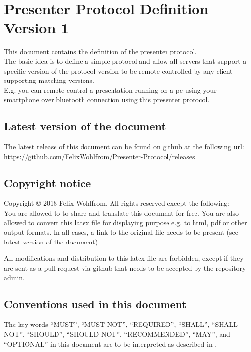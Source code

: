 \documentclass[]{article}
\begin{document}
\section*{Presenter Protocol Definition Version 1}

This document contains the definition of the presenter protocol.\\
The basic idea is to define a simple protocol and allow all servers that support a specific version of the protocol version to be remote controlled by any client supporting matching versions.\\
E.g. you can remote control a presentation running on a pc using your smartphone over bluetooth connection using this presenter protocol.

\tableofcontents

\subsection{Latest version of the document}
\label{latest_version}

The latest release of this document can be found on github at the following url: \url{https://github.com/FelixWohlfrom/Presenter-Protocol/releases}

\subsection{Copyright notice}

Copyright © 2018 Felix Wohlfrom. All rights reserved except the following:\\
You are allowed to to share and translate this document for free. You are also allowed to convert this latex file for displaying purpose e.g. to html, pdf or other output formats. In all cases, a link to the original file needs to be present (see \hyperref[latest_version]{latest version of the document}).

All modifications and distribution to this latex file are forbidden, except if they are sent as a \href{https://github.com/FelixWohlfrom/Presenter-Protocol/pulls}{pull request} via github that needs to be accepted by the repository admin.

\subsection{Conventions used in this document}

The key words ``MUST'', ``MUST NOT'', ``REQUIRED'', ``SHALL'', ``SHALL NOT'', ``SHOULD'', ``SHOULD NOT'', ``RECOMMENDED'', ``MAY'', and ``OPTIONAL'' in this document are to be interpreted as described in \cite{RFC2119}.
\end{document}
